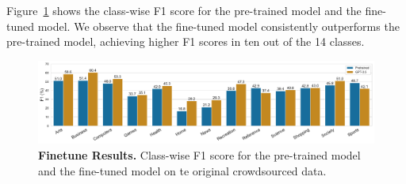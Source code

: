 


Figure~\ref{fig:finetune-results} shows the class-wise F1 score for the pre-trained model and the fine-tuned model. We observe that the fine-tuned model consistently outperforms the pre-trained model, achieving higher F1 scores in ten out of the 14 classes.


\begin{figure}
    \centering
    \includegraphics[width=\textwidth]{./figures/exp2-mf1.pdf}
    \caption{\textbf{Finetune Results.} Class-wise F1 score for the pre-trained model and the fine-tuned model on te original crowdsourced data.}
    \label{fig:finetune-results}
\end{figure}
